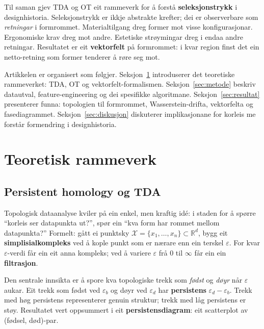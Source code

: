 \documentclass[10pt, a4paper, twocolumn]{article}
\begin{document}
Til saman gjev TDA og OT eit rammeverk for \aa{} forst\aa{} \textbf{seleksjonstrykk} i designhistoria. Seleksjonstrykk er ikkje abstrakte krefter; dei er observerbare som \emph{retningar} i formrommet. Materialtilgang dreg former mot visse konfigurasjonar. Ergonomiske krav dreg mot andre. Estetiske str\o ymingar dreg i endaa andre retningar. Resultatet er eit \textbf{vektorfelt} p\aa{} formrommet: i kvar region finst det ein netto-retning som former tenderer \aa{} r\o re seg mot.

Artikkelen er organisert som f\o lgjer. Seksjon~\ref{sec:teori} introduserer det teoretiske rammeverket: TDA, OT og vektorfelt-formalismen. Seksjon~\ref{sec:metode} beskriv datautval, feature-engineering og dei spesifikke algoritmane. Seksjon~\ref{sec:resultat} presenterer funna: topologien til formrommet, Wasserstein-drifta, vektorfelta og fasediagrammet. Seksjon~\ref{sec:diskusjon} diskuterer implikasjonane for korleis me forst\aa r formendring i designhistoria.


\section{Teoretisk rammeverk}
\label{sec:teori}

\subsection{Persistent homology og TDA}

Topologisk dataanalyse kviler p\aa{} ein enkel, men kraftig id\'{e}: i staden for \aa{} sp\o rre ``korleis ser datapunkta ut?'', sp\o r ein ``kva form har rommet mellom datapunkta?'' Formelt: g\aa tt ei punktsky $\mathcal{X} = \{x_1, \ldots, x_n\} \subset \mathbb{R}^d$, bygg eit \textbf{simplisialkompleks} ved \aa{} kople punkt som er n\ae rare enn ein terskel $\varepsilon$. For kvar $\varepsilon$-verdi f\aa r ein eit anna kompleks; ved \aa{} variere $\varepsilon$ fr\aa{} 0 til $\infty$ f\aa r ein ein \textbf{filtrasjon}.

Den sentrale innsikta er \aa{} spore kva topologiske trekk som \emph{f\o dst} og \emph{d\o yr} n\aa r $\varepsilon$ aukar. Eit trekk som f\o dst ved $\varepsilon_b$ og d\o yr ved $\varepsilon_d$ har \textbf{persistens} $\varepsilon_d - \varepsilon_b$. Trekk med h\o g persistens representerer genuin struktur; trekk med l\aa g persistens er st\o y. Resultatet vert oppsummert i eit \textbf{persistensdiagram}: eit scatterplot av (f\o dsel, d\o d)-par.
\end{document}
